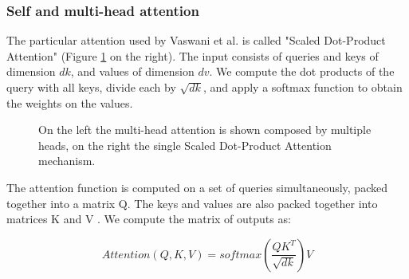 \subsubsection{Self and multi-head attention}
The particular attention used by Vaswani et al. \cite{vaswani2017attention} is called "Scaled Dot-Product Attention" (Figure \ref{fig:transformer_attention} on the right). The input consists of queries and keys of dimension $dk$, and values of dimension $dv$. We compute the dot products of the query with all keys, divide each by $\sqrt{dk}$, and apply a softmax function to obtain the weights on the values.
\begin{figure}[H]%
    \centering
    \caption{On the left the multi-head attention is shown composed by multiple heads, on the right the single Scaled Dot-Product Attention mechanism.}
    \label{fig:transformer_attention}%
\end{figure}
The attention function is computed on a set of queries simultaneously, packed together into a matrix Q. The keys and values are also packed together into matrices K and V . We compute the matrix of outputs as:
\begin{large}
$$Attention(Q, K, V ) = softmax(\frac{QK^T}{\sqrt{dk}})V$$
\end{large}
